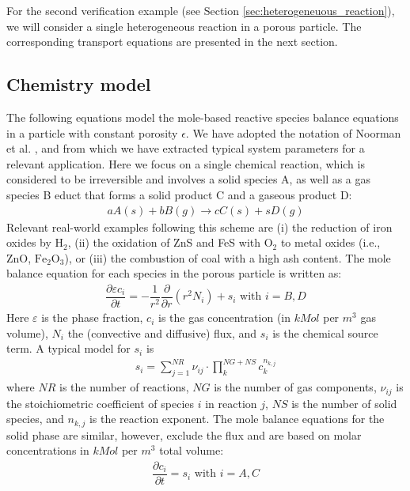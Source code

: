 \documentclass{particles2015}
\begin{document}
For the second verification example (see Section \ref{sec:heterogeneuous_reaction}), we will consider a single heterogeneous reaction in a porous particle. The corresponding transport equations are presented in the next section.

\subsection{Chemistry model}
The following equations model the mole-based reactive species balance equations in a particle with constant porosity $\epsilon$. We have adopted the notation of Noorman et al. \cite{Noorman2011}, and from which we have extracted typical system parameters for a relevant application. Here we focus on a single chemical reaction, which is considered to be irreversible and involves a solid species A, as well as a gas species B educt that forms a solid product C and a gaseous product D:
\begin{align}
a A (s) + bB (g) \rightarrow cC(s) + sD(g)
\end{align}
Relevant real-world examples following this scheme are (i) the reduction of iron oxides by $\text{H}_2$, (ii) the oxidation of ZnS and FeS with $\text{O}_2$ to metal oxides (i.e., ZnO, $\text{Fe}_2\text{O}_3$), or (iii) the combustion of coal with a high ash content. The mole balance equation for each species in the porous particle is written as:
\begin{align}
\dfrac{\partial \varepsilon c_i}{\partial t} = - \dfrac{1}{r^2} \dfrac{\partial}{\partial r } (r^2 N_i) + s_i \text{ with } i = B, D
\end{align}
Here $\varepsilon$ is the phase fraction, $c_i$ is the gas concentration (in $kMol$ per $m^3$ gas volume), $N_i$ the (convective and diffusive) flux, and $s_i$ is the chemical source term. A typical model for $s_i$ is
\begin{align}
s_i = \sum\limits_{j=1}^{NR} \nu_{ij} \cdot \prod\limits_k^{NG+NS} c_k^{n_{k,j}}
\end{align} 
where $NR$ is the number of reactions, $NG$ is the number of gas components, $\nu_{ij}$ is the stoichiometric coefficient of species $i$ in reaction $j$, $NS$ is the number of solid species, and $n_{k,j}$ is the reaction exponent. The mole balance equations for the solid phase are similar, however, exclude the flux and are based on molar concentrations in $kMol$ per $m^3$ total volume:
\begin{align}
\dfrac{\partial c_i}{\partial t} = s_i \text{ with } i = A, C
\end{align}
\end{document}
